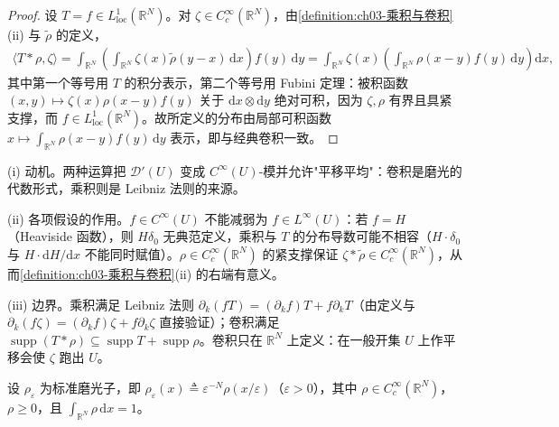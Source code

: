 \documentclass[../../main.tex]{subfiles}%
\begin{document}
\begin{proof}
设 $T=f\in L^1_{\mathrm{loc}}(\mathbb{R}^N)$。对 $\zeta\in C^\infty_c(\mathbb{R}^N)$，由\cref{definition:ch03-乘积与卷积}(ii) 与 $\widetilde\rho$ 的定义，
\begin{align*}
\langle T*\rho,\zeta\rangle
=\int_{\mathbb{R}^N}\left(\int_{\mathbb{R}^N}\zeta(x)\widetilde\rho(y-x)\,\mathrm{d}x\right)f(y)\,\mathrm{d}y
=\int_{\mathbb{R}^N}\zeta(x)\left(\int_{\mathbb{R}^N}\rho(x-y)f(y)\,\mathrm{d}y\right)\mathrm{d}x,
\end{align*}
其中第一个等号用 $T$ 的积分表示，第二个等号用 Fubini 定理：被积函数 $(x,y)\mapsto\zeta(x)\rho(x-y)f(y)$ 关于 $\mathrm{d}x\otimes\mathrm{d}y$ 绝对可积，因为 $\zeta,\rho$ 有界且具紧支撑，而 $f\in L^1_{\mathrm{loc}}(\mathbb{R}^N)$。故所定义的分布由局部可积函数 $x\mapsto\int_{\mathbb{R}^N}\rho(x-y)f(y)\,\mathrm{d}y$ 表示，即与经典卷积一致。
\end{proof}

\begin{remark}\label{remark:ch03-乘积与卷积动机}
(i) 动机。两种运算把 $\mathcal{D}'(U)$ 变成 $C^\infty(U)$-模并允许"平移平均"：卷积是磨光的代数形式，乘积则是 Leibniz 法则的来源。

(ii) 各项假设的作用。$f\in C^\infty(U)$ 不能减弱为 $f\in L^\infty(U)$：若 $f=H$（Heaviside 函数），则 $H\delta_0$ 无典范定义，乘积与 $T$ 的分布导数可能不相容（$H\cdot\delta_0$ 与 $H\cdot\mathrm{d}H/\mathrm{d}x$ 不能同时赋值）。$\rho\in C^\infty_c(\mathbb{R}^N)$ 的紧支撑保证 $\zeta*\widetilde\rho\in C^\infty_c(\mathbb{R}^N)$，从而\cref{definition:ch03-乘积与卷积}(ii) 的右端有意义。

(iii) 边界。乘积满足 Leibniz 法则 $\partial_k(fT)=(\partial_kf)T+f\partial_kT$（由定义与 $\partial_k(f\zeta)=(\partial_kf)\zeta+f\partial_k\zeta$ 直接验证）；卷积满足 $\operatorname{supp}(T*\rho)\subseteq\operatorname{supp}T+\operatorname{supp}\rho$。卷积只在 $\mathbb{R}^N$ 上定义：在一般开集 $U$ 上作平移会使 $\zeta$ 跑出 $U$。
\end{remark}

设 $\rho_\varepsilon$ 为标准磨光子，即 $\rho_\varepsilon(x)\triangleq \varepsilon^{-N}\rho(x/\varepsilon)$（$\varepsilon>0$），其中 $\rho\in C^\infty_c(\mathbb{R}^N)$，$\rho\geqslant0$，且 $\int_{\mathbb{R}^N}\rho\,\mathrm{d}x=1$。
\end{document}
